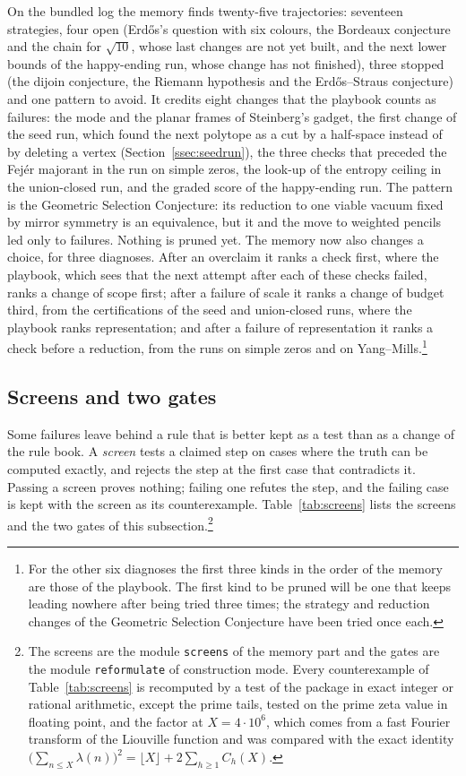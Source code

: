 On the bundled log the memory finds twenty-five trajectories: seventeen strategies, four open (Erd\H{o}s's question with six colours, the Bordeaux conjecture and the chain for $\sqrt{10}$, whose last changes are not yet built, and the next lower bounds of the happy-ending run, whose change has not finished), three stopped (the dijoin conjecture, the Riemann hypothesis and the Erd\H{o}s--Straus conjecture) and one pattern to avoid. It credits eight changes that the playbook counts as failures: the mode and the planar frames of Steinberg's gadget, the first change of the seed run, which found the next polytope as a cut by a half-space instead of by deleting a vertex (Section~\ref{ssec:seedrun}), the three checks that preceded the Fej\'er majorant in the run on simple zeros, the look-up of the entropy ceiling in the union-closed run, and the graded score of the happy-ending run. The pattern is the Geometric Selection Conjecture: its reduction to one viable vacuum fixed by mirror symmetry is an equivalence, but it and the move to weighted pencils led only to failures. Nothing is pruned yet. The memory now also changes a choice, for three diagnoses. After an overclaim it ranks a check first, where the playbook, which sees that the next attempt after each of these checks failed, ranks a change of scope first; after a failure of scale it ranks a change of budget third, from the certifications of the seed and union-closed runs, where the playbook ranks representation; and after a failure of representation it ranks a check before a reduction, from the runs on simple zeros and on Yang--Mills.\footnote{For the other six diagnoses the first three kinds in the order of the memory are those of the playbook. The first kind to be pruned will be one that keeps leading nowhere after being tried three times; the strategy and reduction changes of the Geometric Selection Conjecture have been tried once each.}

\subsection{Screens and two gates}\label{ssec:screens}

Some failures leave behind a rule that is better kept as a test than as a change of the rule book. A \emph{screen} tests a claimed step on cases where the truth can be computed exactly, and rejects the step at the first case that contradicts it. Passing a screen proves nothing; failing one refutes the step, and the failing case is kept with the screen as its counterexample. Table~\ref{tab:screens} lists the screens and the two gates of this subsection.\footnote{The screens are the module \texttt{screens} of the memory part and the gates are the module \texttt{reformulate} of construction mode. Every counterexample of Table~\ref{tab:screens} is recomputed by a test of the package in exact integer or rational arithmetic, except the prime tails, tested on the prime zeta value in floating point, and the factor at $X=4\cdot10^{6}$, which comes from a fast Fourier transform of the Liouville function and was compared with the exact identity $\bigl(\sum_{n\le X}\lambda(n)\bigr)^{2}=\lfloor X\rfloor+2\sum_{h\ge1}C_{h}(X)$.}

